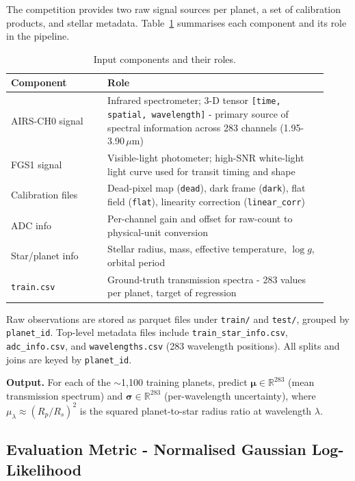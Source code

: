 \documentclass[12pt]{article}
\begin{document}
The competition provides two raw signal sources per planet, a set of calibration products, and stellar metadata. Table~\ref{tab:inputs} summarises each component and its role in the pipeline.

\begin{table}[H]
\centering\small
\caption{Input components and their roles.}
\label{tab:inputs}
\begin{tabular}{@{}p{0.28\linewidth} p{0.64\linewidth}@{}}
\toprule
\textbf{Component} & \textbf{Role} \\
\midrule
AIRS-CH0 signal & Infrared spectrometer; 3-D tensor \texttt{[time, spatial, wavelength]} - primary source of spectral information across 283 channels (1.95-3.90\,$\mu$m) \\
FGS1 signal & Visible-light photometer; high-SNR white-light light curve used for transit timing and shape \\
Calibration files & Dead-pixel map (\texttt{dead}), dark frame (\texttt{dark}), flat field (\texttt{flat}), linearity correction (\texttt{linear\_corr}) \\
ADC info & Per-channel gain and offset for raw-count to physical-unit conversion \\
Star/planet info & Stellar radius, mass, effective temperature, $\log g$, orbital period \\
\texttt{train.csv} & Ground-truth transmission spectra - 283 values per planet, target of regression \\
\bottomrule
\end{tabular}
\end{table}

Raw observations are stored as parquet files under \texttt{train/} and \texttt{test/}, grouped by \texttt{planet\_id}. Top-level metadata files include \texttt{train\_star\_info.csv}, \texttt{adc\_info.csv}, and \texttt{wavelengths.csv} (283 wavelength positions). All splits and joins are keyed by \texttt{planet\_id}.

\textbf{Output.} For each of the $\sim$1,100 training planets, predict $\boldsymbol{\mu} \in \mathbb{R}^{283}$ (mean transmission spectrum) and $\boldsymbol{\sigma} \in \mathbb{R}^{283}$ (per-wavelength uncertainty), where $\mu_\lambda \approx (R_p/R_s)^2$ is the squared planet-to-star radius ratio at wavelength $\lambda$.

\subsection{Evaluation Metric - Normalised Gaussian Log-Likelihood}
\end{document}
